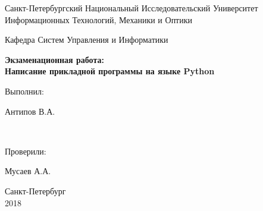 \begin{titlepage}
  \begin{center}
    \vspace{2cm}
    Санкт-Петербургский Национальный Исследовательский Университет\\
    Информационных Технологий, Механики и Оптики

    \vspace{6cm}

    Кафедра Систем Управления и Информатики

    \vspace{3cm}
    \textbf{Экзаменационная работа:\\ Написание прикладной программы на языке Python}
  \end{center}
  \vspace{4cm}
  \hfill
  \parbox[top][3cm][t]{3cm}{Выполнил:}
  \parbox[top][3cm][t]{3cm}{
  Антипов В.А.}
  \\

  \hfill
  \parbox[right][3cm][t]{3cm}{Проверили:}
  \parbox[right][3cm][t]{3cm}{
  Мусаев А.А.}

  \vfill
  \begin{center}
  Санкт-Петербург \\ 2018
  \end{center}
\end{titlepage}